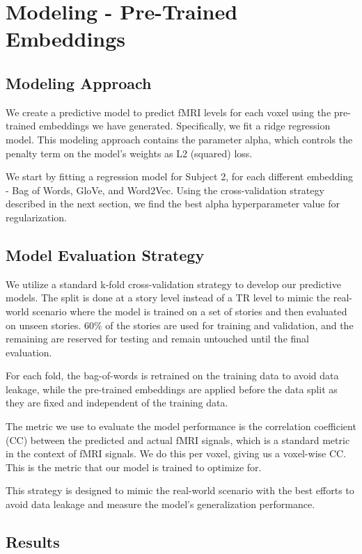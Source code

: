 \documentclass[10pt,letterpaper]{article}
\begin{document}
\section{Modeling - Pre-Trained Embeddings}

\subsection{Modeling Approach}
We create a predictive model to predict fMRI levels for each voxel using the pre-trained embeddings we have generated. Specifically, we fit a ridge regression model. This modeling approach contains the parameter alpha, which controls the penalty term on the model's weights as L2 (squared) loss.

We start by fitting a regression model for Subject 2, for each different embedding - Bag of Words, GloVe, and Word2Vec. Using the cross-validation strategy described in the next section, we find the best alpha hyperparameter value for regularization.

\subsection{Model Evaluation Strategy}

We utilize a standard k-fold cross-validation strategy to develop our predictive models. The split is done at a story level instead of a TR level to mimic the real-world scenario where the model is trained on a set of stories and then evaluated on unseen stories. 60\% of the stories are used for training and validation, and the remaining are reserved for testing and remain untouched until the final evaluation.

For each fold, the bag-of-words is retrained on the training data to avoid data leakage, while the pre-trained embeddings are applied before the data split as they are fixed and independent of the training data.

The metric we use to evaluate the model performance is the correlation coefficient (CC) between the predicted and actual fMRI signals, which is a standard metric in the context of fMRI signals. We do this per voxel, giving us a voxel-wise CC. This is the metric that our model is trained to optimize for.

This strategy is designed to mimic the real-world scenario with the best efforts to avoid data leakage and measure the model's generalization performance.

\subsection{Results}
\end{document}
